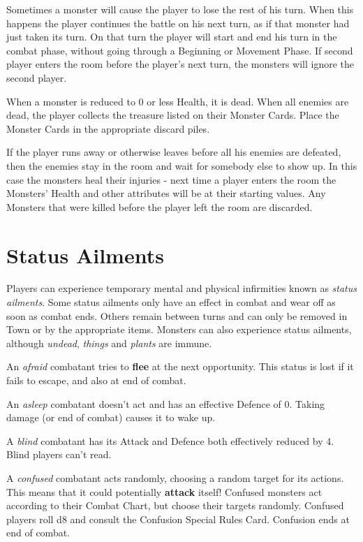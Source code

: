 \documentclass{book}
\begin{document}
Sometimes a monster will cause the player to lose the rest of his turn. When this happens the player continues the battle on his next turn, as if that monster had just taken its turn. On that turn the player will start and end his turn in the combat phase, without going through a Beginning or Movement Phase. If second player enters the room before the player’s next turn, the monsters will ignore the second player.

When a monster is reduced to 0 or less Health, it is dead. When all enemies are dead, the player collects the treasure listed on their Monster Cards. Place the Monster Cards in the appropriate discard piles.

If the player runs away or otherwise leaves before all his enemies are defeated, then the enemies stay in the room and wait for somebody else to show up. In this case the monsters heal their injuries - next time a player enters the room the Monsters’ Health and other attributes will be at their starting values. Any Monsters that were killed before the player left the room are discarded.

\section{Status Ailments}
Players can experience temporary mental and physical infirmities known as \emph{status ailments}. Some status ailments only have an effect in combat and wear off as soon as combat ends. Others remain between turns and can only be removed in Town or by the appropriate items. Monsters can also experience status ailments, although \emph{undead}, \emph{things} and \emph{plants} are immune.

An \emph{afraid} combatant tries to \textbf{flee} at the next opportunity. This status is lost if it fails to escape, and also at end of combat.

An \emph{asleep} combatant doesn’t act and has an effective Defence of 0. Taking damage (or end of combat) causes
it to wake up.

A \emph{blind} combatant has its Attack and Defence both effectively reduced by 4. Blind players can’t read.

A \emph{confused} combatant acts randomly, choosing a random target for its actions. This means that it could potentially \textbf{attack} itself! Confused monsters act according to their Combat Chart, but choose their targets randomly.  Confused players roll d8 and consult the Confusion Special Rules Card. Confusion ends at end of combat.
\end{document}
